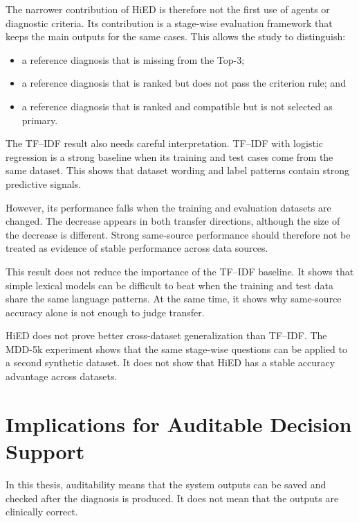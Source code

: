 \documentclass[12pt,a4paper,oneside]{report}
\begin{document}
The narrower contribution of HiED is therefore not the first use of
agents or diagnostic criteria. Its contribution is a stage-wise
evaluation framework that keeps the main outputs for the same cases.
This allows the study to distinguish:

\begin{itemize}
    \item a reference diagnosis that is missing from the Top-3;
    \item a reference diagnosis that is ranked but does not pass the
    criterion rule; and
    \item a reference diagnosis that is ranked and compatible but is
    not selected as primary.
\end{itemize}

The TF--IDF result also needs careful interpretation. TF--IDF with
logistic regression is a strong baseline when its training and test
cases come from the same dataset. This shows that dataset wording and
label patterns contain strong predictive signals.

However, its performance falls when the training and evaluation
datasets are changed. The decrease appears in both transfer directions,
although the size of the decrease is different. Strong same-source
performance should therefore not be treated as evidence of stable
performance across data sources.

This result does not reduce the importance of the TF--IDF baseline. It
shows that simple lexical models can be difficult to beat when the
training and test data share the same language patterns. At the same
time, it shows why same-source accuracy alone is not enough to judge
transfer.

HiED does not prove better cross-dataset generalization than TF--IDF.
The MDD-5k experiment shows that the same stage-wise questions can be
applied to a second synthetic dataset. It does not show that HiED has a
stable accuracy advantage across datasets.

\section{Implications for Auditable Decision Support}
\label{sec:discussion-set-scope-transfer}
\label{sec:discussion-clinical-implications}

In this thesis, auditability means that the system outputs can be saved
and checked after the diagnosis is produced. It does not mean that the
outputs are clinically correct.
\end{document}
